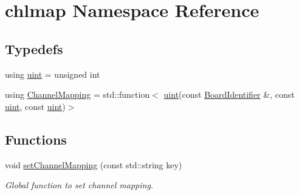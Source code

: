 \hypertarget{namespacechlmap}{}\section{chlmap Namespace Reference}
\label{namespacechlmap}
\subsection*{Typedefs}
\begin{DoxyCompactItemize}
\item 
using \hyperlink{namespacechlmap_a51093e4e5b1ccf24696e04d671728200}{uint} = unsigned int
\item 
using \hyperlink{namespacechlmap_a5bb86fec567a6f1a0646881a9284bb01}{Channel\+Mapping} = std\+::function$<$ \hyperlink{namespacechlmap_a51093e4e5b1ccf24696e04d671728200}{uint}(const \hyperlink{class_board_identifier}{Board\+Identifier} \&, const \hyperlink{namespacechlmap_a51093e4e5b1ccf24696e04d671728200}{uint}, const \hyperlink{namespacechlmap_a51093e4e5b1ccf24696e04d671728200}{uint})$>$
\end{DoxyCompactItemize}
\subsection*{Functions}
\begin{DoxyCompactItemize}
\item 
void \hyperlink{namespacechlmap_a945bd413e64427712373da77277dd443}{set\+Channel\+Mapping} (const std\+::string key)
\begin{DoxyCompactList}\small\item\em Global function to set channel mapping. \end{DoxyCompactList}\end{DoxyCompactItemize}
